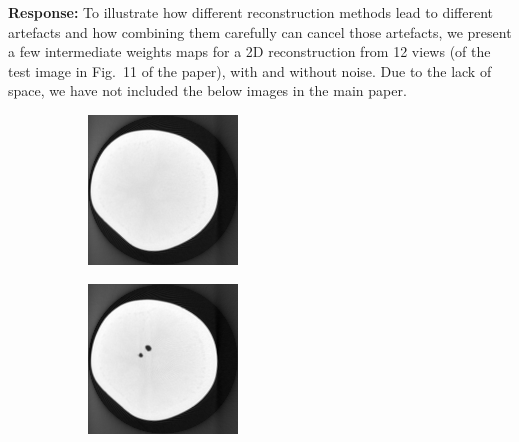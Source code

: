\documentclass{article}
\begin{document}
\textbf{Response:} To illustrate how different reconstruction methods lead to different artefacts and how combining them carefully can cancel those artefacts, we present a few intermediate weights maps for a 2D reconstruction from 12 views (of the test image in Fig.~11 of the paper), with and without noise. Due to the lack of space, we have not included the below images in the main paper.
\begin{figure}[!h]
    \begin{subfigure}[b]{0.24\linewidth}
        \includegraphics[width=\textwidth]{../images/potato/template_1.png}
\captionsetup{labelformat=empty}       
 \caption{}
    \end{subfigure}
    \begin{subfigure}[b]{0.24\linewidth}
        \includegraphics[width=\textwidth]{../images/potato/template_2.png}

\end{subfigure}
\end{figure}
\end{document}
